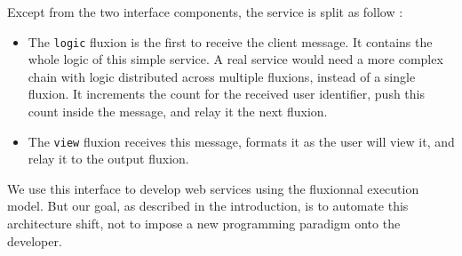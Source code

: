 Except from the two interface components, the service is split as follow :
\begin{itemize}
  \item The \texttt{logic} fluxion is the first to receive the client message.
  It contains the whole logic of this simple service.
  A real service would need a more complex chain with logic distributed across multiple fluxions, instead of a single fluxion.
  It increments the count for the received user identifier, push this count inside the message, and relay it the next fluxion.
  \item The \texttt{view} fluxion receives this message, formats it as the user will view it, and relay it to the output fluxion.
\end{itemize}

We use this interface to develop web services using the fluxionnal execution model.
But our goal, as described in the introduction, is to automate this architecture shift, not to impose a new programming paradigm onto the developer.


